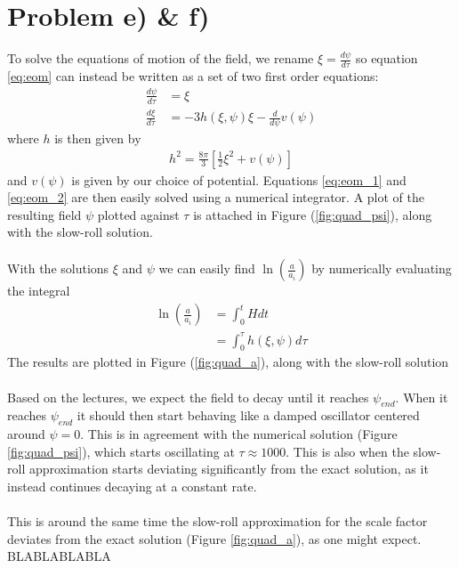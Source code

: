 \documentclass[reprint,english,notitlepage]{revtex4-1}  %
\numberwithin{equation}{section}
\begin{document}
\section{Problem e) \& f)}
To solve the equations of motion of the field, we rename
$\xi = \frac{d\psi}{d\tau}$ so equation \ref{eq:eom} can instead be written as
a set of two first order equations:
\begin{align}
	\frac{d\psi}{d\tau} &= \xi \label{eq:eom_1} \\
	\frac{d\xi}{d\tau}  &= -3h(\xi, \psi) \xi - \frac{d}{d\psi}v(\psi) \label{eq:eom_2}
\end{align}
where $h$ is then given by
\begin{align}
	h^2 = \frac{8\pi}{3}\left[ \frac{1}{2}\xi^2 + v(\psi)\right]
\end{align}
and $v(\psi)$ is given by our choice of potential. Equations \ref{eq:eom_1} and
\ref{eq:eom_2} are then easily solved using a numerical integrator. A plot of
the resulting field $\psi$ plotted against $\tau$ is attached in Figure
(\ref{fig:quad_psi}), along with the slow-roll solution.
\\ \\
With the
solutions $\xi$ and $\psi$ we can easily find $\ln\left(\frac{a}{a_i}\right)$
by numerically evaluating the integral
\begin{align}
	\ln\left(\frac{a}{a_i}\right) &= \int_0^t H dt \\
																&= \int_0^\tau h(\xi, \psi) d\tau
\end{align}
The results are plotted in Figure (\ref{fig:quad_a}), along with the slow-roll
solution
\\ \\
Based on the lectures, we expect the field to decay until it reaches $\psi_{end}$.
When it reaches $\psi_{end}$ it should then start behaving like a damped oscillator
centered around $\psi=0$. This is in agreement with the numerical solution
(Figure \ref{fig:quad_psi}), which starts oscillating at $\tau\approx 1000$.
This is also when the slow-roll approximation starts deviating significantly
from the exact solution, as it instead continues decaying at a constant rate.
\\ \\
This is around the same time the slow-roll approximation for the scale factor
deviates from the exact solution (Figure \ref{fig:quad_a}), as one might expect.
BLABLABLABLA
\end{document}
